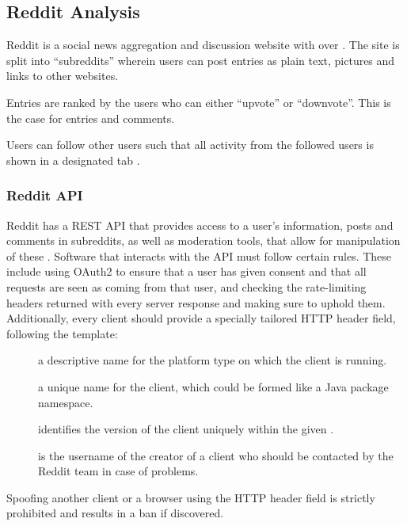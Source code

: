 \subsection{Reddit Analysis}\label{sec:reddit-analysis}
Reddit is a social news aggregation and discussion website with over 
\citep{AdvertiseOnReddit}.
The site is split into ``subreddits'' wherein users can post entries as plain text, pictures and links to other websites. \nl

Entries are ranked by the users who can either ``upvote'' or ``downvote''. This
is the case for entries and comments. \citep{AboutReddit}\nl

Users can follow other users such that all activity from the followed users is
shown in a designated tab .

\subsubsection{Reddit API}\label{subsec:reddit-api}

Reddit has a \ac{REST} \ac{API} that provides access to a user's information,
posts and comments in subreddits, as well as moderation tools, that allow for
manipulation of these \citep{RedditApi}. Software that interacts with the
\ac{API} must follow certain rules. These include using OAuth2 to ensure that a
user has given consent and that all requests are seen as coming from that user,
and checking the rate-limiting headers returned with every server response and
making sure to uphold them.
Additionally, every client should provide a specially tailored 
\ac{HTTP} header field, following the template: \citep{RedditApiRules}\nl

\begin{center}
\end{center}\nl
\begin{description}
  \item[] a descriptive name for the platform type on which the client is running.
  \item[] a unique name for the client, which could be formed like a Java package namespace.
  \item[] identifies the version of the client uniquely
  within the given .
  \item[] is the username of the creator of a client who
  should be contacted by the Reddit team in case of problems.
\end{description}\nl

Spoofing another client or a browser using the  \ac{HTTP} header field is strictly prohibited and
results in a ban if discovered. \citep{RedditApiRules}\nl